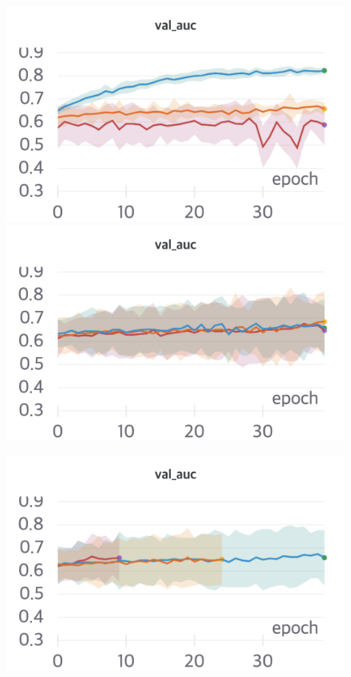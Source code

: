 \documentclass{article}
\begin{document}
\begin{figure}[!htb]
\includegraphics[width=\linewidth]{charts/Section-1-Panel-4-o3s5hpyz4}
\caption{}
\endminipage\hfill
{}
\includegraphics[width=\linewidth]{charts/Section-1-Panel-5-sx501t4z6}
\caption{}
\endminipage
\end{figure}

\begin{figure}[!htb]
\includegraphics[width=\linewidth]{charts/Section-1-Panel-6-x5g6rl4y4}
\caption{}
\endminipage
\end{figure}

\nocite{*}


\end{document}
